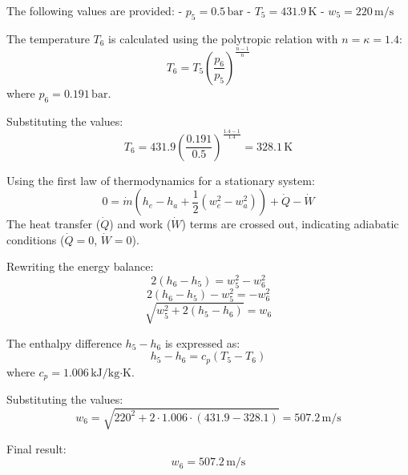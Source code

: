 The following values are provided:  
- \( p_5 = 0.5 \, \text{bar} \)  
- \( T_5 = 431.9 \, \text{K} \)  
- \( w_5 = 220 \, \text{m/s} \)  

The temperature \( T_6 \) is calculated using the polytropic relation with \( n = \kappa = 1.4 \):  
\[
T_6 = T_5 \left( \frac{p_6}{p_5} \right)^{\frac{n-1}{n}}
\]  
where \( p_6 = 0.191 \, \text{bar} \).  

Substituting the values:  
\[
T_6 = 431.9 \left( \frac{0.191}{0.5} \right)^{\frac{1.4-1}{1.4}} = 328.1 \, \text{K}
\]  

Using the first law of thermodynamics for a stationary system:  
\[
0 = \dot{m} \left( h_e - h_a + \frac{1}{2} \left( w_e^2 - w_a^2 \right) \right) + \dot{Q} - \dot{W}
\]  
The heat transfer (\( \dot{Q} \)) and work (\( \dot{W} \)) terms are crossed out, indicating adiabatic conditions (\( \dot{Q} = 0 \), \( \dot{W} = 0 \)).  

Rewriting the energy balance:  
\[
2(h_6 - h_5) = w_5^2 - w_6^2
\]  
\[
2(h_6 - h_5) - w_5^2 = -w_6^2
\]  
\[
\sqrt{w_5^2 + 2(h_5 - h_6)} = w_6
\]  

The enthalpy difference \( h_5 - h_6 \) is expressed as:  
\[
h_5 - h_6 = c_p (T_5 - T_6)
\]  
where \( c_p = 1.006 \, \text{kJ/kg·K} \).  

Substituting the values:  
\[
w_6 = \sqrt{220^2 + 2 \cdot 1.006 \cdot (431.9 - 328.1)} = 507.2 \, \text{m/s}
\]  

Final result:  
\[
w_6 = 507.2 \, \text{m/s}
\]